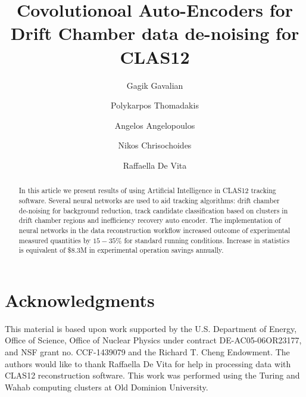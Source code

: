 \documentclass[preprint,12pt]{elsarticle}
\title{Covolutionoal Auto-Encoders for Drift Chamber data de-noising for CLAS12}
\author[1]{Gagik Gavalian}
\author[2]{Polykarpos Thomadakis}
\author[2]{Angelos Angelopoulos}
\author[2]{Nikos Chrisochoides}
\author[3]{Raffaella De Vita}
\begin{document}
\begin{abstract}

In this article we present results of using Artificial Intelligence in CLAS12 tracking software. Several neural networks are used to aid tracking algorithms: drift chamber de-noising for background reduction, track candidate classification based on clusters in drift chamber regions and inefficiency recovery auto encoder. The implementation of neural networks in the data reconstruction workflow increased outcome of experimental measured quantities by $15-35\%$ for standard running conditions. Increase in statistics is equivalent of \$$8.3$M in experimental operation savings annually.

\end{abstract}
\maketitle











%

\newpage

\section{Acknowledgments}

This material is based upon work supported by the U.S. Department of Energy, Office of Science,
Office of Nuclear Physics under contract DE-AC05-06OR23177, and NSF grant no. CCF-1439079 and
the Richard T. Cheng Endowment. The authors would like to thank Raffaella De Vita for help in
processing data with CLAS12 reconstruction software. This work was performed using the Turing
and Wahab computing clusters at Old Dominion University.
 
\newpage


\end{document}
